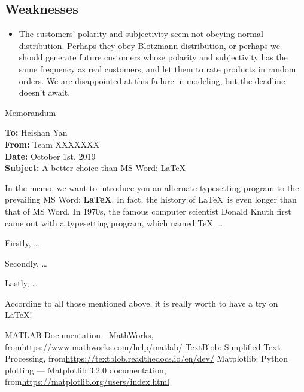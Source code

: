 \documentclass[12pt]{article}  %
\begin{document}
\subsection{Weaknesses}
\begin{itemize}
    \item The customers' polarity and subjectivity seem not obeying normal distribution. Perhaps they obey Blotzmann distribution, or perhaps we should generate future customers whose polarity and subjectivity has the same frequency as real customers, and let them to rate products in random orders. We are disappointed at this failure in modeling, but the deadline doesn't await.
 \end{itemize}


\begin{letter}{Memorandum}
\begin{flushleft}  %
\textbf{To:} Heishan Yan\\
\textbf{From:} Team XXXXXXX\\
\textbf{Date:} October 1st, 2019\\
\textbf{Subject:} A better choice than MS Word: \LaTeX
\end{flushleft}

In the memo, we want to introduce you an alternate typesetting program to the prevailing MS Word: \textbf{\LaTeX}. In fact, the history of \LaTeX\ is even longer than that of MS Word. In 1970s, the famous computer scientist Donald Knuth first came out with a typesetting program, which named \TeX\ \ldots

Firstly, \ldots

Secondly, \ldots

Lastly, \ldots

According to all those mentioned above, it is really worth to have a try on \LaTeX! 
\end{letter}


\begin{thebibliography}{99}
 MATLAB Documentation - MathWorks, from\url{https://www.mathworks.com/help/matlab/}
 TextBlob: Simplified Text Processing, from\url{https://textblob.readthedocs.io/en/dev/}
 Matplotlib: Python plotting — Matplotlib 3.2.0 documentation, from\url{https://matplotlib.org/users/index.html}

\end{thebibliography}
\end{document}
